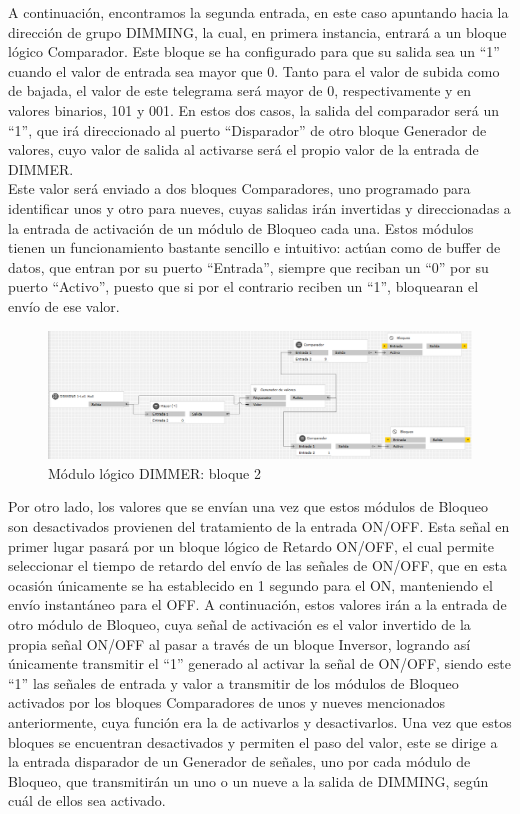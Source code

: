 A continuación, encontramos la segunda entrada, en este caso apuntando hacia la dirección de grupo DIMMING, la cual, en primera instancia, entrará a un bloque lógico Comparador. Este bloque se ha configurado para que su salida sea un “1” cuando el valor de entrada sea mayor que 0. Tanto para el valor de subida como de bajada, el valor de este telegrama será mayor de 0, respectivamente y en valores binarios, 101 y 001. En estos dos  casos, la salida del comparador será un “1”, que irá direccionado al puerto “Disparador” de otro bloque Generador de valores, cuyo valor de salida al activarse será el propio valor de la entrada de DIMMER. \\ Este valor será enviado a dos bloques Comparadores, uno programado para identificar unos y otro para nueves, cuyas salidas irán invertidas y direccionadas a la entrada de activación de un módulo de Bloqueo cada una. Estos módulos tienen un funcionamiento bastante sencillo e intuitivo: actúan como de buffer de datos, que entran por su puerto “Entrada”, siempre que reciban un “0” por su puerto “Activo”, puesto que si por el contrario reciben un “1”, bloquearan el envío de ese valor. 
 \begin{center}
\begin{figure}[H]
\includegraphics[width=1.15\textwidth]{figures/log_dimm_b2.png}   
\caption{Módulo lógico DIMMER: bloque 2}
\label{fig:log_dimm_b2}
\end{figure}
\end{center}
Por otro lado, los valores que se envían una vez que estos módulos de Bloqueo son desactivados provienen del tratamiento de la entrada ON/OFF. Esta señal en primer lugar pasará por un bloque lógico de Retardo ON/OFF, el cual permite seleccionar el tiempo de retardo del envío de las señales de ON/OFF, que en esta ocasión únicamente se ha establecido en 1 segundo para el ON, manteniendo el envío instantáneo para el OFF. A continuación, estos valores irán a la entrada de otro módulo de Bloqueo, cuya señal de activación es el valor invertido de la propia señal ON/OFF al pasar a través de un bloque Inversor, logrando así únicamente transmitir el “1” generado al activar la señal de ON/OFF, siendo este “1” las señales de entrada y valor a transmitir de los módulos de Bloqueo activados por los bloques Comparadores de unos y nueves mencionados anteriormente, cuya función era la de activarlos y desactivarlos. Una vez que estos bloques se encuentran desactivados y permiten el paso del valor, este se dirige a la entrada disparador de un Generador de señales, uno por cada módulo de Bloqueo, que transmitirán un uno o un nueve a la salida de DIMMING, según cuál de ellos sea activado.
